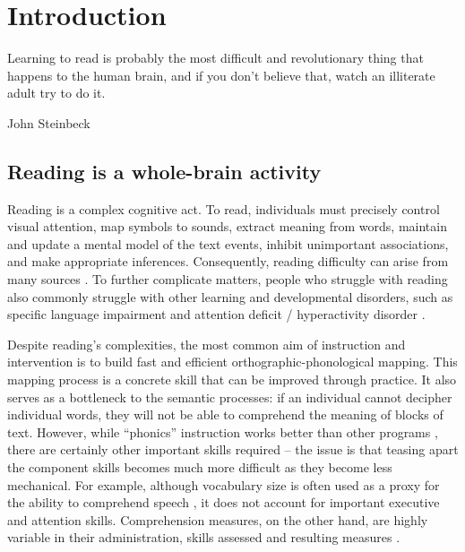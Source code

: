 \chapter{Introduction}

\epigraph{Learning to read is probably the most difficult and revolutionary thing that happens to the human brain, and if you don't believe that, watch an illiterate adult try to do it.}{John Steinbeck}

\section{Reading is a whole-brain activity}
Reading is a complex cognitive act. To read, individuals must precisely control visual attention, map symbols to sounds, extract meaning from words, maintain and update a mental model of the text events, inhibit unimportant associations, and make appropriate inferences. Consequently, reading difficulty can arise from many sources \citep{Pennington2009, vanderLely2010}. To further complicate matters, people who struggle with reading also commonly struggle with other learning and developmental disorders, such as specific language impairment and attention deficit / hyperactivity disorder \citep{Pennington2006, Margari2013}.

Despite reading's complexities, the most common aim of instruction and intervention is to build fast and efficient orthographic-phonological mapping. This mapping process is a concrete skill that can be improved through practice. It also serves as a bottleneck to the semantic processes: if an individual cannot decipher individual words, they will not be able to comprehend the meaning of blocks of text. However, while ``phonics'' instruction works better than other programs \citep{NationalReadingPanel2000}, there are certainly other important skills required -- the issue is that teasing apart the component skills becomes much more difficult as they become less mechanical. For example, although vocabulary size is often used as a proxy for the ability to comprehend speech \citep{Spencer2014}, it does not account for important executive and attention skills. Comprehension measures, on the other hand, are highly variable in their administration, skills assessed and resulting measures \citep{Cutting2009a}.


